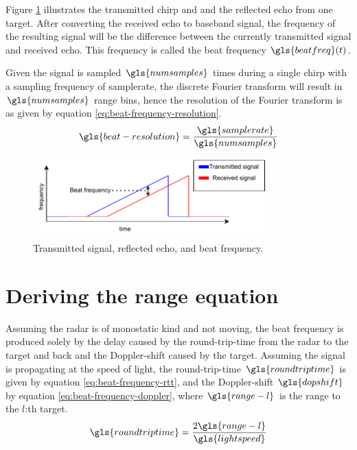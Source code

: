 Figure \ref{fig:beat-frequency} illustrates the transmitted chirp and and the reflected echo
from one target. After converting the received echo to baseband signal,
the frequency of the resulting signal will be the difference between the currently transmitted signal and received echo.
This frequency is called the beat frequency $\gls{beatfreq}(t)$.

Given the signal is sampled $\gls{numsamples}$ times during a single chirp with a sampling frequency of \gls{samplerate},
the discrete Fourier transform will result in $\gls{numsamples}$ range bins,
hence the resolution of the Fourier transform is as given by equation \ref{eq:beat-frequency-resolution}.
\begin{equation}
    \label{eq:beat-frequency-resolution}
    \gls{beat-resolution} = \frac{\gls{samplerate}}{\gls{numsamples}}
\end{equation}

\begin{figure}
    \centering
    \includegraphics[width=0.8\textwidth]{fig/appendices/beat-frequency.pdf}
    \caption{Transmitted signal, reflected echo, and beat frequency.}
    \label{fig:beat-frequency}
\end{figure}

\section{Deriving the range equation}
Assuming the radar is of monostatic kind and not moving,
the beat frequency is produced solely by the delay caused by the round-trip-time from the radar to the target and back
and the Doppler-shift caused by the target.
Assuming the signal is propagating at the speed of light, the round-trip-time $\gls{roundtriptime}$ is given by equation \ref{eq:beat-frequency-rtt},
and the Doppler-shift $\gls{dopshift}$ by equation \ref{eq:beat-frequency-doppler},
where $\gls{range-l}$ is the range to the $l$:th target.
\begin{equation}
    \label{eq:beat-frequency-rtt}
    \gls{roundtriptime} = \frac{2\gls{range-l}}{\gls{lightspeed}}
\end{equation}

